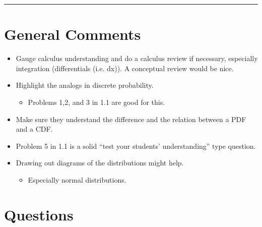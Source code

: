 \documentclass{exam}
\title{}
\date{Markov Chains, Continuous Probability, Conditional Expectation}
\begin{document}
\maketitle
\rule{\textwidth}{0.15em}
\fontsize{12}{15}\selectfont
\thispagestyle{empty}


\section{General Comments}
\begin{itemize}
\item Gauge calculus understanding and do a calculus review if necessary, 
especially integration (differentials (i.e. dx)). A conceptual
review would be nice. 
\item Highlight the analogs in discrete probability. 
\begin{itemize}
\item Problems 1,2, and 3 in 1.1 are good for this. 
\end{itemize}
\item Make sure they understand the difference and the relation between 
a PDF and a CDF.
\item Problem 5 in 1.1 is a solid ``test your students' understanding'' type question. 
\item Drawing out diagrams of the distributions might help.
\begin{itemize}
\item Especially normal distributions.
\end{itemize}
\end{itemize}
\section{Questions}
\end{document}
